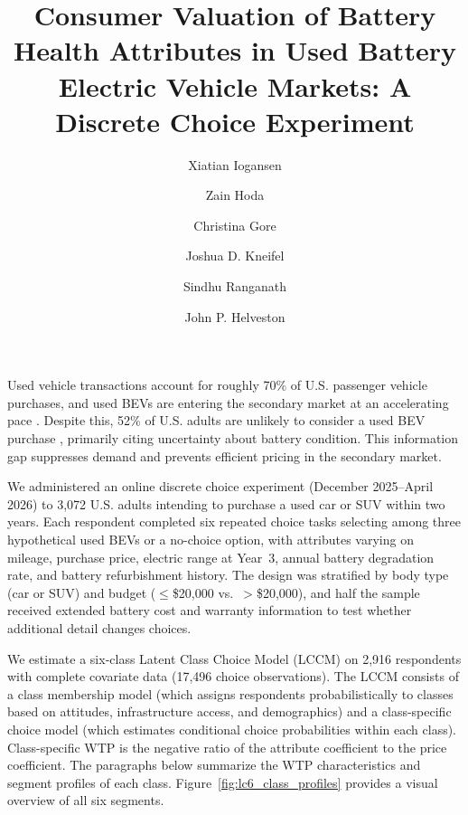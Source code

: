\documentclass[9pt,a4paper]{extarticle}
\date{}
\begin{document}
\title{\large\textbf{Consumer Valuation of Battery Health Attributes in Used Battery Electric Vehicle Markets: A Discrete Choice Experiment}}

\author[1,2]{Xiatian Iogansen}
\author[2]{Zain Hoda}
\author[1]{Christina Gore}
\author[1]{Joshua D. Kneifel}
\author[1,2]{Sindhu Ranganath}
\author[2]{John P. Helveston}


\maketitle
\vspace{-1.5em}

Used vehicle transactions account for roughly 70\% of U.S. passenger vehicle purchases, and used BEVs are entering the secondary market at an accelerating pace \parencite{coxautomotiveinc.EVMarketMonitor2025}. Despite this, 52\% of U.S. adults are unlikely to consider a used BEV purchase \parencite{fernandesUSUnderstandingConsumer2023}, primarily citing uncertainty about battery condition. This information gap suppresses demand and prevents efficient pricing in the secondary market.

We administered an online discrete choice experiment (December 2025--April 2026) to 3,072 U.S. adults intending to purchase a used car or SUV within two years. Each respondent completed six repeated choice tasks selecting among three hypothetical used BEVs or a no-choice option, with attributes varying on mileage, purchase price, electric range at Year~3, annual battery degradation rate, and battery refurbishment history. The design was stratified by body type (car or SUV) and budget ($\leq$\$20,000 vs.\ $>$\$20,000), and half the sample received extended battery cost and warranty information to test whether additional detail changes choices.

We estimate a six-class Latent Class Choice Model (LCCM) on 2,916 respondents with complete covariate data (17,496 choice observations). The LCCM consists of a class membership model (which assigns respondents probabilistically to classes based on attitudes, infrastructure access, and demographics) and a class-specific choice model (which estimates conditional choice probabilities within each class). Class-specific WTP is the negative ratio of the attribute coefficient to the price coefficient. The paragraphs below summarize the WTP characteristics and segment profiles of each class. Figure~\ref{fig:lc6_class_profiles} provides a visual overview of all six segments.
\end{document}
